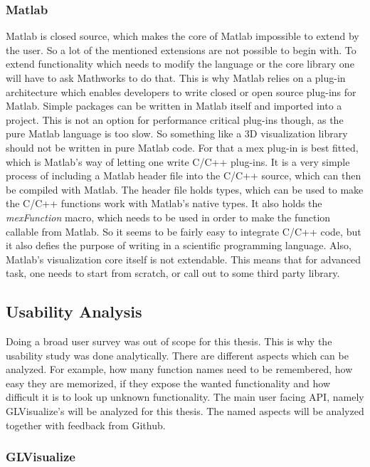 {\subsubsection{Matlab}

Matlab is closed source, which makes the core of Matlab impossible to extend by the user. So a lot of the mentioned extensions are not possible to begin with. 
To extend functionality which needs to modify the language or the core library one will have to ask Mathworks to do that.
This is why Matlab relies on a plug-in architecture which enables developers to write closed or open source plug-ins for Matlab. 
Simple packages can be written in Matlab itself and imported into a project.
This is not an option for performance critical plug-ins though, as the pure Matlab language is too slow.
So something like a 3D visualization library should not be written in pure Matlab code.
For that a mex plug-in is best fitted, which is Matlab's way of letting one write C/C++ plug-ins.
It is a very simple process of including a Matlab header file into the C/C++ source, which can then be compiled with Matlab.
The header file holds types, which can be used to make the C/C++ functions work with Matlab's native types.
It also holds the \textit{mexFunction} macro, which needs to be used in order to make the function callable from Matlab.
So it seems to be fairly easy to integrate C/C++ code, but it also defies the purpose of writing in a scientific programming language.
Also, Matlab's visualization core itself is not extendable. 
This means that for advanced task, one needs to start from scratch, or call out to some third party library.


\subsection{Usability Analysis}
Doing a broad user survey was out of scope for this thesis.
This is why the usability study was done analytically.
There are different aspects which can be analyzed. For example, how many function names need to be remembered, how easy they are memorized, if they expose the wanted functionality and how difficult it is to look up unknown functionality.
The main user facing \ac{API}, namely GLVisualize’s will be analyzed for this thesis. 
The named aspects will be analyzed together with feedback from Github.

\subsubsection{GLVisualize}

}
